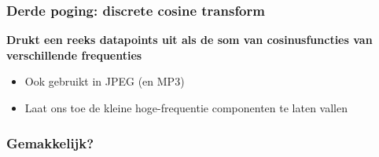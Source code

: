 \documentclass{beamer}
\begin{document}

\begin{frame}
  \frametitle{Derde poging: discrete cosine transform}

  \pause

  {\bf Drukt een reeks datapoints uit als de som van cosinusfuncties van
       verschillende frequenties}

  \begin{itemize}
    \pause \item Ook gebruikt in JPEG (en MP3)
    \pause \item Laat ons toe de kleine hoge-frequentie componenten te laten
                 vallen
  \end{itemize}
\end{frame}

\begin{frame}[fragile]
  \frametitle{Gemakkelijk?}

  

\end{frame}
\end{document}
